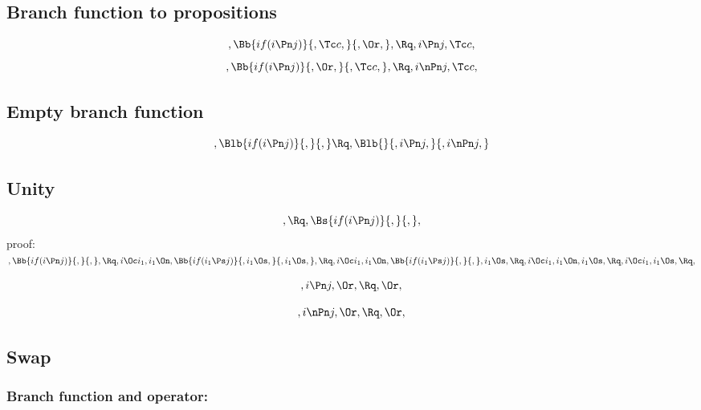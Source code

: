 \subsection{Branch function to propositions}
\[,\Bb{if(i \Pn j)}{,\Tc c,}{,\Or,}, \Rq ,i \Pn j, \Tc c,\]
\bigskip
\bigskip
\[,\Bb{if(i \Pn j)}{,\Or,}{,\Tc c,}, \Rq ,i \nPn j, \Tc c,\]
\bigskip
\bigskip


\subsection{Empty branch function} 
\[, \Blb{if(i \Pn j)}{,}{,} \Rq , \Blb{}{, i \Pn j,}{, i \nPn j,}\]

\bigskip
\bigskip

\subsection{ Unity}
\[, \Rq , \Bs{if(i \Pn j)}{,}{,},\]
\bigskip
\bigskip
proof:\\
\begin{math} 
,\Bb{if(i \Pn j)}{,}{,},\\\\
\Rq, i \Oc i_1, i_1 \On, \Bb{if(i_1 \Ps j)}{, i_1 \Os,}{, i_1 \Os,},\\\\\\
\Rq, i \Oc i_1, i_1 \On, \Bb{if(i_1 \Ps j)}{,}{,}, i_1 \Os,\\\\\\
\Rq, i \Oc i_1, i_1 \On,  i_1 \Os,\\\\\\
\Rq, i \Oc i_1,  i_1 \Os,\\\\\\
\Rq, 
\end{math}
\bigskip
\bigskip


\[, i \Pn j, \Or, \Rq , \Or,\]

\[, i \nPn j, \Or, \Rq , \Or,\]



\bigskip
\bigskip
\bigskip
\bigskip
\subsection{ Swap}
\subsubsection{Branch function and operator:}

